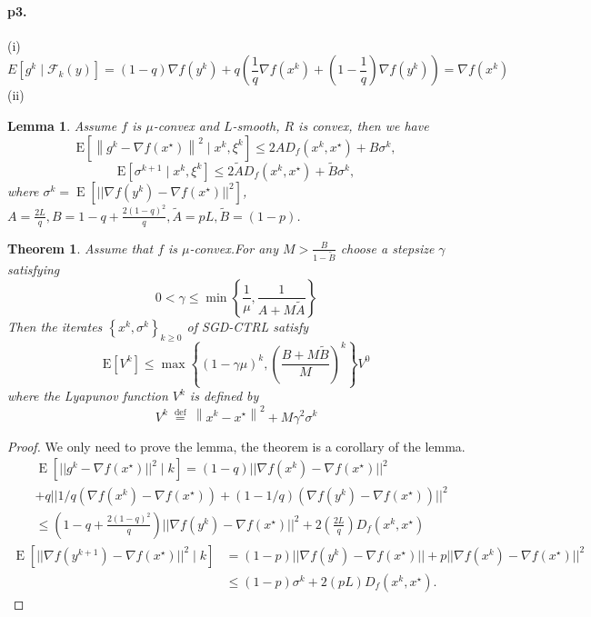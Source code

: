 \documentclass[12pt,a4paper]{article}
\newtheorem*{lemma}{Lemma}
\newtheorem*{theorem}{Theorem}
\DeclareMathOperator{\E}{\mathrm{E}}
\begin{document}
	\paragraph{p3.}
	(i)
	\begin{equation*}
		E\left[g^k\mid \mathcal{F}_k(y)\right]=(1-q)\nabla f(y^k)+q(\frac{1}{q}\nabla f(x^k)+(1-\frac{1}{q})\nabla f(y^k))=\nabla f(x^k)
	\end{equation*}
	(ii)
	\begin{lemma}
		Assume $f$ is $\mu$-convex and $L$-smooth, $R$ is convex, then we have 
		$$
		\mathrm{E}\left[\left\|g^{k}-\nabla f\left(x^{\star}\right)\right\|^{2} \mid x^{k}, \xi^{k}\right] \leq 2 A D_{f}\left(x^{k}, x^{\star}\right)+B \sigma^{k},
		$$
		$$
		\mathrm{E}\left[\sigma^{k+1} \mid x^{k}, \xi^{k}\right] \leq 2 \tilde{A} D_{f}\left(x^{k}, x^{\star}\right)+\tilde{B} \sigma^{k},
		$$
		where $\sigma^k=\E\left[||\nabla f(y^k)-\nabla f(x^{\star}) ||^2\right]$, $A=\frac{2L}{q},B=1-q+\frac{2(1-q)^2}{q},\tilde{A}=pL,\tilde{B}=(1-p)$.
	\end{lemma}
	\begin{theorem}
		Assume that $f$ is $\mu$-convex.For any $M>\frac{B}{1-\tilde{B}}$ choose a stepsize $\gamma$ satisfying
		$$
		0<\gamma \leq \min \left\{\frac{1}{\mu}, \frac{1}{A+M \tilde{A}}\right\}
		$$
		Then the iterates $\left\{x^{k}, \sigma^{k}\right\}_{k \geq 0}$ of SGD-CTRL satisfy
		$$
		\mathrm{E}\left[V^{k}\right] \leq \max \left\{(1-\gamma \mu)^{k},\left(\frac{B+M \tilde{B}}{M}\right)^{k}\right\} V^{0}
		$$
		where the Lyapunov function $V^{k}$ is defined by
		$$
		V^{k} \stackrel{\text { def }}{=}\left\|x^{k}-x^{\star}\right\|^{2}+M \gamma^{2} \sigma^{k}
		$$
	\end{theorem}
	\begin{proof}
		We only need to prove the lemma, the theorem is a corollary of the lemma.
		\begin{equation*}
			\begin{aligned}
				&\E\left[||g^k-\nabla f(x^{\star})||^2\mid k\right]=(1-q)||\nabla f(x^k)-\nabla f(x^{\star})||^2\\
				&+q||1/q (\nabla f(x^k)-\nabla f(x^{\star}))+(1-1/q)(\nabla f(y^k)-\nabla f(x^{\star}))||^2\\
				&\leq (1-q+\frac{2(1-q)^2}{q})||\nabla f(y^k)-\nabla f(x^{\star})||^2+2(\frac{2L}{q})D_f(x^k,x^{\star})
			\end{aligned}
		\end{equation*}
		\begin{equation*}
			\begin{aligned}
				\E\left[||\nabla f(y^{k+1})-\nabla f(x^{\star})||^2\mid k\right]&=(1-p)||\nabla f(y^k)-\nabla f(x^{\star})||+p||\nabla f(x^k)-\nabla f(x^{\star})||^2\\
				&\leq(1-p)\sigma^k+2(pL)D_f(x^k,x^{\star}).
			\end{aligned}
		\end{equation*}
		\end{proof}
\end{document}
